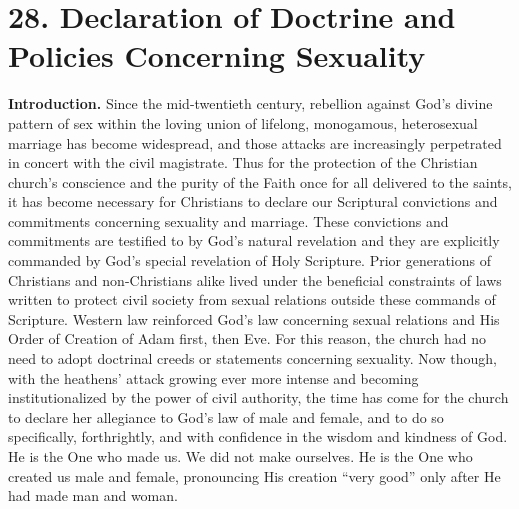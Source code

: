 \documentclass[
]{book}
\begin{document}
\hypertarget{declaration-of-doctrine-and-policies-concerning-sexuality}{%
\section*{28. Declaration of Doctrine and Policies Concerning Sexuality}\label{declaration-of-doctrine-and-policies-concerning-sexuality}}

\protect\hypertarget{chapter-slug-28-declaration-of-doctrine-and-policies-concerning-sexuality}{\href{}{}}

\protect\hypertarget{28}{\href{}{}}\textbf{Introduction.} Since the mid-twentieth century, rebellion against God's divine pattern of sex within the loving union of lifelong, monogamous, heterosexual marriage has become widespread, and those attacks are increasingly perpetrated in concert with the civil magistrate. Thus for the protection of the Christian church's conscience and the purity of the Faith once for all delivered to the saints, it has become necessary for Christians to declare our Scriptural convictions and commitments concerning sexuality and marriage. These convictions and commitments are testified to by God's natural revelation and they are explicitly commanded by God's special revelation of Holy Scripture. Prior generations of Christians and non-Christians alike lived under the beneficial constraints of laws written to protect civil society from sexual relations outside these commands of Scripture. Western law reinforced God's law concerning sexual relations and His Order of Creation of Adam first, then Eve. For this reason, the church had no need to adopt doctrinal creeds or statements concerning sexuality. Now though, with the heathens' attack growing ever more intense and becoming institutionalized by the power of civil authority, the time has come for the church to declare her allegiance to God's law of male and female, and to do so specifically, forthrightly, and with confidence in the wisdom and kindness of God. He is the One who made us. We did not make ourselves. He is the One who created us male and female, pronouncing His creation ``very good'' only after He had made man and woman.
\end{document}
